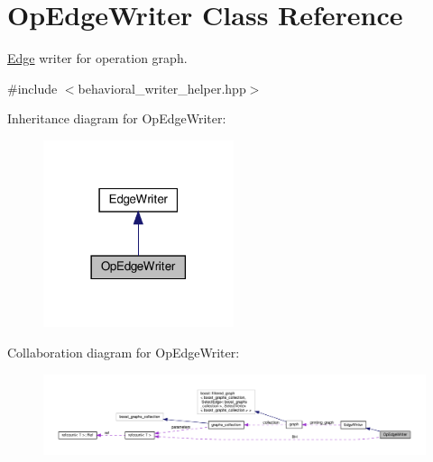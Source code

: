 \hypertarget{classOpEdgeWriter}{}\section{Op\+Edge\+Writer Class Reference}
\label{classOpEdgeWriter}


\hyperlink{structEdge}{Edge} writer for operation graph.  




{\ttfamily \#include $<$behavioral\+\_\+writer\+\_\+helper.\+hpp$>$}



Inheritance diagram for Op\+Edge\+Writer\+:
\nopagebreak
\begin{figure}[H]
\begin{center}
\leavevmode
\includegraphics[width=158pt]{d0/d6a/classOpEdgeWriter__inherit__graph}
\end{center}
\end{figure}


Collaboration diagram for Op\+Edge\+Writer\+:
\nopagebreak
\begin{figure}[H]
\begin{center}
\leavevmode
\includegraphics[width=350pt]{d8/dde/classOpEdgeWriter__coll__graph}
\end{center}
\end{figure}
